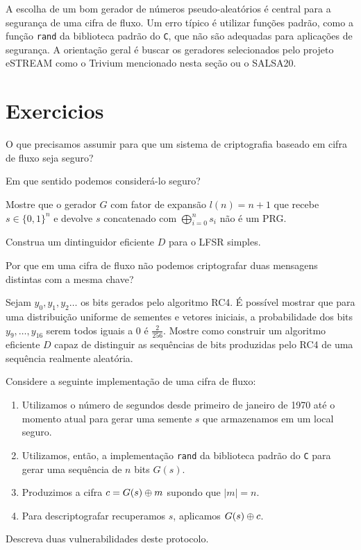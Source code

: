 A escolha de um bom gerador de números pseudo-aleatórios é central para a segurança de uma cifra de fluxo.
Um erro típico é utilizar funções padrão, como a função {\tt rand} da biblioteca padrão do {\tt C}, que não são adequadas para aplicações de segurança.
A orientação geral é buscar os geradores selecionados pelo projeto eSTREAM como o Trivium mencionado nesta seção ou o SALSA20.


\section{Exercicios}
\label{sec:exercicios}

\begin{exercicio}
  O que precisamos assumir para que um sistema de criptografia baseado em cifra de fluxo seja seguro?

  Em que sentido podemos considerá-lo seguro?
\end{exercicio}

\begin{exercicio}
Mostre que o gerador $G$ com fator de expansão $l(n) = n + 1$ que recebe $s \in \{0,1\}^n$ e devolve $s$ concatenado com $\bigoplus_{i=0}^ns_i$ não é um PRG.  
\end{exercicio}

\begin{exercicio}
  Construa um dintinguidor eficiente $D$ para o LFSR simples.
\end{exercicio}

\begin{exercicio}
  Por que em uma cifra de fluxo não podemos criptografar duas mensagens distintas com a mesma chave?
\end{exercicio}

\begin{exercicio}
 Sejam $y_0, y_1, y_2 \dots$ os bits gerados pelo algoritmo RC4.
É possível mostrar que para uma distribuição uniforme de sementes e vetores iniciais, a probabilidade dos bits $y_9, \dots, y_{16}$ serem todos iguais a $0$ é $\frac{2}{256}$.
Mostre como construir um algoritmo eficiente $D$ capaz de distinguir as sequências de bits produzidas pelo RC4 de uma sequência realmente aleatória.
\end{exercicio}

\begin{exercicio}
  Considere a seguinte implementação de uma cifra de fluxo:
\begin{enumerate}
\item Utilizamos o número de segundos desde primeiro de janeiro de 1970 até o momento atual para gerar uma semente $s$ que armazenamos em um local seguro.
\item Utilizamos, então, a implementação {\tt rand} da biblioteca padrão do {\tt C} para gerar uma sequência de $n$ bits $G(s)$.
\item Produzimos a cifra $c = G(s) \oplus m$ supondo que $|m| = n$.
\item Para descriptografar recuperamos $s$, aplicamos $G(s) \oplus c$.
\end{enumerate}

  Descreva duas vulnerabilidades deste protocolo.
\end{exercicio}


